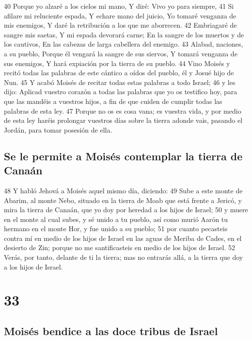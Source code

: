 40 Porque yo alzaré a los cielos mi mano,
Y diré: Vivo yo para siempre,
41 Si afilare mi reluciente espada,
Y echare mano del juicio,
Yo tomaré venganza de mis enemigos,
Y daré la retribución a los que me aborrecen. 
42 Embriagaré de sangre mis saetas,
Y mi espada devorará carne;
En la sangre de los muertos y de los cautivos,
En las cabezas de larga cabellera del enemigo.
43 Alabad, naciones, a su pueblo, 
Porque él vengará la sangre de sus siervos, 
Y tomará venganza de sus enemigos,
Y hará expiación por la tierra de su pueblo.
44 Vino Moisés y recitó todas las palabras de este cántico a oídos del pueblo, él y Josué hijo de Nun.
45 Y acabó Moisés de recitar todas estas palabras a todo Israel;
46 y les dijo: Aplicad vuestro corazón a todas las palabras que yo os testifico hoy, para que las mandéis a vuestros hijos, a fin de que cuiden de cumplir todas las palabras de esta ley.
47 Porque no os es cosa vana; es vuestra vida, y por medio de esta ley haréis prolongar vuestros días sobre la tierra adonde vais, pasando el Jordán, para tomar posesión de ella.

\section*{Se le permite a Moisés contemplar la tierra de Canaán}

48 Y habló Jehová a Moisés aquel mismo día, diciendo:
49 Sube a este monte de Abarim, al monte Nebo, situado en la tierra de Moab que está frente a Jericó, y mira la tierra de Canaán, que yo doy por heredad a los hijos de Israel;
50 y muere en el monte al cual subes, y sé unido a tu pueblo, así como murió Aarón tu hermano en el monte Hor, y fue unido a su pueblo;
51 por cuanto pecasteis contra mí en medio de los hijos de Israel en las aguas de Meriba de Cades, en el desierto de Zin; porque no me santificasteis en medio de los hijos de Israel.
52 Verás, por tanto, delante de ti la tierra; mas no entrarás allá, a la tierra que doy a los hijos de Israel.

\chapter{33}

\section*{Moisés bendice a las doce tribus de Israel}


